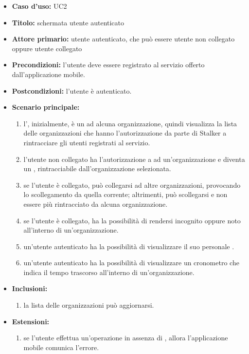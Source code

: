 \documentclass[../analisi-dei-requisiti]{subfiles}
\begin{document}
\begin{itemize}
  \item \textbf{Caso d’uso:} UC2
  \item \textbf{Titolo:} schermata utente autenticato
  \item \textbf{Attore primario:} utente autenticato, che può essere utente non collegato oppure utente collegato
  \item \textbf{Precondizioni:} l'utente deve essere registrato al servizio offerto dall'applicazione mobile.
  \item \textbf{Postcondizioni:} l'utente è autenticato.
  \item \textbf{Scenario principale:} 
  \begin{enumerate}
    \item l', inizialmente, è un  ad alcuna organizzazione, quindi visualizza la lista delle organizzazioni che hanno 
    l'autorizzazione da parte di Stalker a rintracciare gli utenti registrati al servizio.
    \item l'utente non collegato ha l'autorizzazione a  ad un'organizzazione e diventa un , rintracciabile dall'organizzazione selezionata.
    \item se l'utente è collegato, può collegarsi ad altre organizzazioni, provocando lo scollegamento da quella corrente; altrimenti, può scollegarsi e non essere più rintracciato da
    alcuna organizzazione.
    \item se l'utente è collegato, ha la possibilità di rendersi incognito oppure noto all'interno di un'organizzazione.
    \item un'utente autenticato ha la possibilità di visualizzare il suo personale .
    \item un'utente autenticato ha la possibilità di visualizzare un cronometro che indica il tempo trascorso all'interno di un'organizzazione.
  \end{enumerate}
  \item \textbf{Inclusioni:}
  \begin{enumerate}
    \item la lista delle organizzazioni può aggiornarsi.
  \end{enumerate}
  \item \textbf{Estensioni:} 
  \begin{enumerate}
    \item se l'utente effettua un'operazione in assenza di , allora l'applicazione mobile comunica l'errore.
  \end{enumerate}
\end{itemize}
\end{document}
